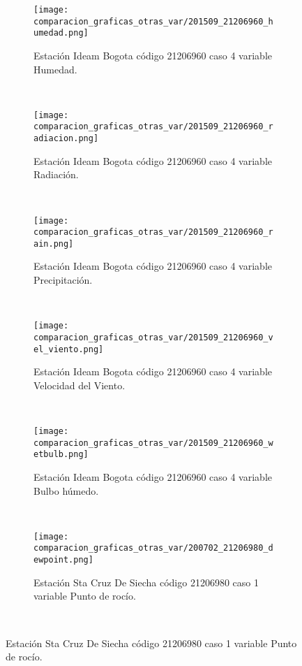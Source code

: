 \begin{figure}[H]
\centering
\begin{subfigure}[normla]{0.4\textwidth}
\caption{Estación Ideam Bogota código 21206960 caso 4 variable Humedad.}
\texttt{[image: comparacion\_graficas\_otras\_var/201509\_21206960\_humedad.png]}
\end{subfigure}
~
\begin{subfigure}[normla]{0.4\textwidth}
\caption{Estación Ideam Bogota código 21206960 caso 4 variable Radiación.}
\texttt{[image: comparacion\_graficas\_otras\_var/201509\_21206960\_radiacion.png]}
\end{subfigure}
~
\begin{subfigure}[normla]{0.4\textwidth}
\caption{Estación Ideam Bogota código 21206960 caso 4 variable Precipitación.}
\texttt{[image: comparacion\_graficas\_otras\_var/201509\_21206960\_rain.png]}
\end{subfigure}
~
\begin{subfigure}[normla]{0.4\textwidth}
\caption{Estación Ideam Bogota código 21206960 caso 4 variable Velocidad del Viento.}
\texttt{[image: comparacion\_graficas\_otras\_var/201509\_21206960\_vel\_viento.png]}
\end{subfigure}
~
\begin{subfigure}[normla]{0.4\textwidth}
\caption{Estación Ideam Bogota código 21206960 caso 4 variable Bulbo húmedo.}
\texttt{[image: comparacion\_graficas\_otras\_var/201509\_21206960\_wetbulb.png]}
\end{subfigure}
~
\begin{subfigure}[normla]{0.4\textwidth}
\caption{Estación Sta Cruz De Siecha código 21206980 caso 1 variable Punto de rocío.}
\texttt{[image: comparacion\_graficas\_otras\_var/200702\_21206980\_dewpoint.png]}
\end{subfigure}
~
\end{figure}
           

